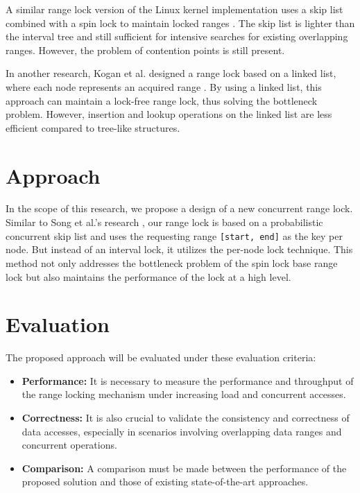 A similar range lock version of the Linux kernel implementation uses a skip list combined with a spin lock to maintain locked ranges \parencite{migrationWM2023}. The skip list is lighter than the interval tree and still sufficient for intensive searches for existing overlapping ranges. However, the problem of contention points is still present.

In another research,  Kogan et al. designed a range lock based on a linked list, where each node represents an acquired range \parencite{scalableRangeLock2020}. By using a linked list, this approach can maintain a lock-free range lock, thus solving the bottleneck problem. However, insertion and lookup operations on the linked list are less efficient compared to tree-like structures.

\newpage

\section{Approach}
In the scope of this research, we propose a design of a new concurrent range lock. Similar to Song et al.'s research \parencite{linuxRangeLockImpl2013}, our range lock is based on a probabilistic concurrent skip list and uses the requesting range \texttt{[start, end]} as the key per node. But instead of an interval lock, it utilizes the per-node lock technique. This method not only addresses the bottleneck problem of the spin lock base range lock but also maintains the performance of the lock at a high level.

\section{Evaluation}
The proposed approach will be evaluated under these evaluation criteria:
\begin{itemize}
    \item \textbf{Performance:} It is necessary to measure the performance and throughput of the range locking mechanism under increasing load and concurrent accesses.
    \item \textbf{Correctness:} It is also crucial to validate the consistency and correctness of data accesses, especially in scenarios involving overlapping data ranges and concurrent operations.
    \item \textbf{Comparison:} A comparison must be made between the performance of the proposed solution and those of existing state-of-the-art approaches.
\end{itemize}

